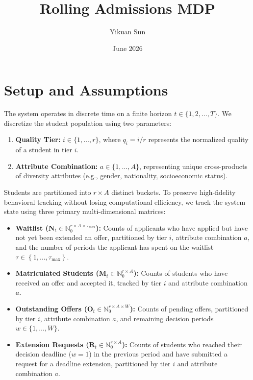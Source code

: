 \documentclass{article}
\title{Rolling Admissions MDP}
\author{Yikuan Sun}
\date{June 2026}
\newcommand{\Set}[1]{\left\{ #1 \right\}}
\begin{document}
\maketitle


\section{Setup and Assumptions}

The system operates in discrete time on a finite horizon $t \in \{1, 2, \dots, T\}$. We discretize the student population using two parameters:
\begin{enumerate}
    \item \textbf{Quality Tier:} $i \in \{1, \dots, r\}$, where $q_i = i/r$ represents the normalized quality of a student in tier $i$.
    \item \textbf{Attribute Combination:} $a \in \{1, \dots, A\}$, representing unique cross-products of diversity attributes (e.g., gender, nationality, socioeconomic status).
\end{enumerate}

Students are partitioned into $r \times A$ distinct buckets. To preserve high-fidelity behavioral tracking without losing computational efficiency, we track the system state using three primary multi-dimensional matrices:
\begin{itemize}
    \item \textbf{Waitlist ($\mathbf{N}_t \in \mathbb{N}_0^{r \times A \times \tau_{\max}}$):} Counts of applicants who have applied but have not yet been extended an offer, partitioned by tier $i$, attribute combination $a$, and the number of periods the applicant has spent on the waitlist $\tau \in \Set{1, \dots, \tau_{\max}}$.
    \item \textbf{Matriculated Students ($\mathbf{M}_t \in \mathbb{N}_0^{r \times A}$):} Counts of students who have received an offer and accepted it, tracked by tier $i$ and attribute combination $a$.
    \item \textbf{Outstanding Offers ($\mathbf{O}_t \in \mathbb{N}_0^{r \times A \times W}$):} Counts of pending offers, partitioned by tier $i$, attribute combination $a$, and remaining decision periods $w \in \{1, \dots, W\}$.
    \item \textbf{Extension Requests ($\mathbf{R}_t \in \mathbb{N}_0^{r \times A}$):} Counts of students who reached their decision deadline ($w=1$) in the previous period and have submitted a request for a deadline extension, partitioned by tier $i$ and attribute combination $a$.
\end{itemize}
\end{document}
